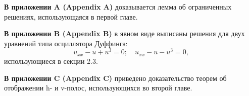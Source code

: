 \documentclass[candidate, href, colorlinks]{disser}
\begin{document}
\textbf{В приложении A (Appendix A)} доказывается лемма об ограниченных решениях, использующаяся в первой главе.

\textbf{В приложении B (Appendix B)} в явном виде выписаны решения для двух уравнений типа осциллятора Дуффинга: 
\begin{equation}
	u_{xx} - u + u^3 = 0; \quad u_{xx} - u - u^3 = 0,
\end{equation}
использующиеся в секции 2.3.

\textbf{В приложении C (Appendix C)} приведено доказательство теорем об отображении h- и v-полос, использующихся во второй главе.


\def\thispagestyle#1{}
\renewcommand{\bibname}{\protect\leftline{\large Список публикаций автора по теме диссертации}}
\printbibliography[keyword=own]


\end{document}
